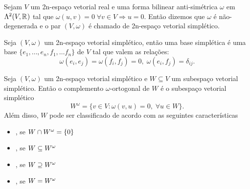 \documentclass{beamer}
\begin{document}
	\begin{frame}
		\begin{definicao}
			Sejam $V$ um 2n-espaço vetorial real e uma forma bilinear anti-simétrica $\omega$ em $\Lambda^{2}(V, \mathbb{R}^{})$ tal que $\omega(u,v) = 0 \; \forall v \in V \Rightarrow u=0$. Então dizemos que $\omega$ é não-degenerada e o par $(V, \omega)$ é chamado de 2n-espaço vetorial simplético.
		\end{definicao}
		\begin{definicao}
			Seja $(V, \omega)$ um 2n-espaço vetorial simplético, então uma base simplética é uma base $\{ e_{1},\dots, e_{n},f_{1},\dots f_{n}\}$ de $V$ tal que valem as relações:
			$$
			\omega(e_{i}, e_{j}) = \omega(f_{i}, f_{j}) = 0, \; \omega(e_{i}, f_{j}) = \delta_{ij}.
			$$
		\end{definicao}
		
	\end{frame}
	
	\begin{frame}
		\begin{definicao}
			Seja $(V, \omega)$ um 2n-espaço vetorial simplético e $W\subseteq V$ um subespaço vetorial simplético. Então o complemento $\omega$-ortogonal de $W$ é o subespaço vetorial simplético
			$$
			W^{\omega} = \{v\in V: \omega(v,u) = 0,\;\forall u\in W \}.
			$$
			Além disso, $W$ pode ser classificado de acordo com as seguintes características
			\begin{itemize}
				\item {}, se $W\cap W^{\omega} = \{0\}$
				
				\item {}, se $W \subseteq W^{\omega}$
				
				\item {}, se $W\supseteq W^{\omega}$
				
				\item {}, se $W =W^{\omega}$
			\end{itemize}
		\end{definicao}	
		
	\end{frame}
	
\end{document}

